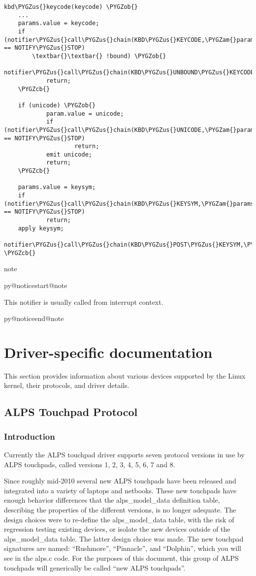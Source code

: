 \documentclass[a4paper,8pt,english]{sphinxmanual}
\makeatletter
\renewenvironment{notice}[2]{%
          \def\py@noticetype{#1}
          \begin{coloredbox}{#1}
          \bf\it
          \par\strong{#2}
          \csname py@noticestart@#1\endcsname
        }
	{
          \csname py@noticeend@\py@noticetype\endcsname
          \end{coloredbox}
        }
\def\PYGZus{\char`\_}
\def\PYGZob{\char`\{}
\def\PYGZcb{\char`\}}
\def\PYGZam{\char`\&}
\makeatother
\begin{document}
\begin{Verbatim}[commandchars=\\\{\}]
kbd\PYGZus{}keycode(keycode) \PYGZob{}
    ...
    params.value = keycode;
    if (notifier\PYGZus{}call\PYGZus{}chain(KBD\PYGZus{}KEYCODE,\PYGZam{}params) == NOTIFY\PYGZus{}STOP)
        \textbar{}\textbar{} !bound) \PYGZob{}
            notifier\PYGZus{}call\PYGZus{}chain(KBD\PYGZus{}UNBOUND\PYGZus{}KEYCODE,\PYGZam{}params);
            return;
    \PYGZcb{}

    if (unicode) \PYGZob{}
            param.value = unicode;
            if (notifier\PYGZus{}call\PYGZus{}chain(KBD\PYGZus{}UNICODE,\PYGZam{}params) == NOTIFY\PYGZus{}STOP)
                    return;
            emit unicode;
            return;
    \PYGZcb{}

    params.value = keysym;
    if (notifier\PYGZus{}call\PYGZus{}chain(KBD\PYGZus{}KEYSYM,\PYGZam{}params) == NOTIFY\PYGZus{}STOP)
            return;
    apply keysym;
    notifier\PYGZus{}call\PYGZus{}chain(KBD\PYGZus{}POST\PYGZus{}KEYSYM,\PYGZam{}params);
\PYGZcb{}
\end{Verbatim}

\begin{notice}{note}{Note:}
This notifier is usually called from interrupt context.
\end{notice}


\chapter{Driver-specific documentation}
\label{input/devices/index:driver-specific-documentation}\label{input/devices/index::doc}
This section provides information about various devices supported by the
Linux kernel, their protocols, and driver details.


\section{ALPS Touchpad Protocol}
\label{input/devices/alps:alps-touchpad-protocol}\label{input/devices/alps::doc}

\subsection{Introduction}
\label{input/devices/alps:introduction}
Currently the ALPS touchpad driver supports seven protocol versions in use by
ALPS touchpads, called versions 1, 2, 3, 4, 5, 6, 7 and 8.

Since roughly mid-2010 several new ALPS touchpads have been released and
integrated into a variety of laptops and netbooks.  These new touchpads
have enough behavior differences that the alps\_model\_data definition
table, describing the properties of the different versions, is no longer
adequate.  The design choices were to re-define the alps\_model\_data
table, with the risk of regression testing existing devices, or isolate
the new devices outside of the alps\_model\_data table.  The latter design
choice was made.  The new touchpad signatures are named: ``Rushmore'',
``Pinnacle'', and ``Dolphin'', which you will see in the alps.c code.
For the purposes of this document, this group of ALPS touchpads will
generically be called ``new ALPS touchpads''.
\end{document}
